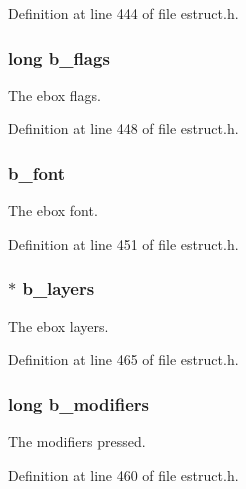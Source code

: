 Definition at line 444 of file estruct.\-h.

\hypertarget{struct__ebox_abdae234dbd983dfbfb0592858c4ff026}{
\subsubsection[{b\-\_\-flags}]{\setlength{\rightskip}{0pt plus 5cm}long b\-\_\-flags}}\label{struct__ebox_abdae234dbd983dfbfb0592858c4ff026}
The ebox flags. 

Definition at line 448 of file estruct.\-h.

\hypertarget{struct__ebox_a4071412a20456f5fcafe2a91cdef11c3}{
\subsubsection[{b\-\_\-font}]{ b\-\_\-font}}\label{struct__ebox_a4071412a20456f5fcafe2a91cdef11c3}
The ebox font. 

Definition at line 451 of file estruct.\-h.

\hypertarget{struct__ebox_ad80949f483467d74761a9e321300d64e}{
\subsubsection[{b\-\_\-layers}]{$\ast$ b\-\_\-layers}}\label{struct__ebox_ad80949f483467d74761a9e321300d64e}
The ebox layers. 

Definition at line 465 of file estruct.\-h.

\hypertarget{struct__ebox_ad230697acdd2d00abb2dc18dd38089d8}{
\subsubsection[{b\-\_\-modifiers}]{\setlength{\rightskip}{0pt plus 5cm}long b\-\_\-modifiers}}\label{struct__ebox_ad230697acdd2d00abb2dc18dd38089d8}
The modifiers pressed. 

Definition at line 460 of file estruct.\-h.

